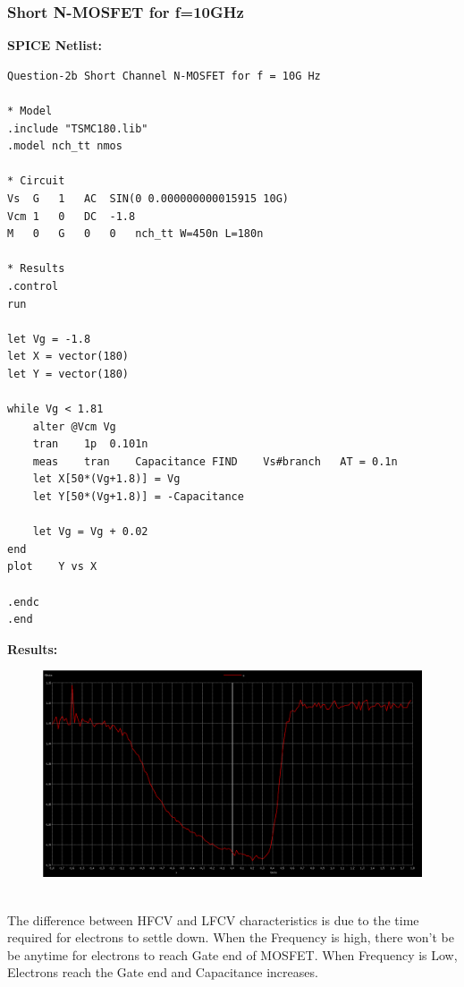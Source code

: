 \documentclass{article}
\begin{document}
\subsubsection{Short N-MOSFET for f=10GHz}
\textbf{SPICE Netlist:}
\begin{lstlisting}
Question-2b Short Channel N-MOSFET for f = 10G Hz

* Model
.include "TSMC180.lib"
.model nch_tt nmos

* Circuit
Vs	G	1	AC	SIN(0 0.000000000015915 10G)
Vcm	1	0	DC	-1.8
M	0	G	0	0	nch_tt W=450n L=180n

* Results
.control
run

let Vg = -1.8
let X = vector(180)
let Y = vector(180)

while Vg < 1.81
	alter @Vcm Vg
	tran	1p	0.101n		
	meas	tran	Capacitance	FIND	Vs#branch	AT = 0.1n
	let X[50*(Vg+1.8)] = Vg
	let Y[50*(Vg+1.8)] = -Capacitance

	let Vg = Vg + 0.02
end
plot	Y vs X

.endc
.end
\end{lstlisting}
\textbf{Results:}
\begin{figure}[!ht]
    \centering
    \includegraphics[scale=0.22]{Images/2bshort2.png}
\end{figure}\\
The difference between HFCV and LFCV characteristics is due to the time required for electrons to settle down. When the Frequency is high, there won't be be anytime for electrons to reach Gate end of MOSFET. When Frequency is Low, Electrons reach the Gate end and Capacitance increases.
\end{document}
